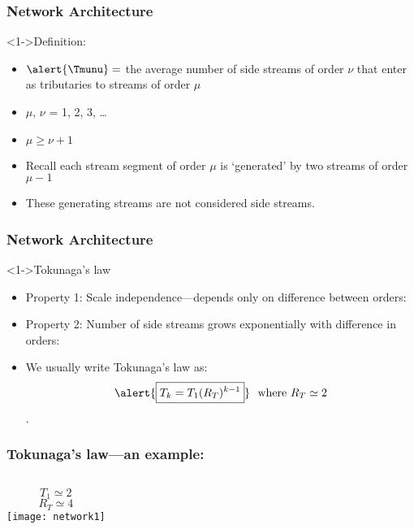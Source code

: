 
\begin{frame}[label=]
  \frametitle{Network Architecture}

  \begin{block}<1->{Definition:}
    \begin{itemize}
    \item<1-> 
      $ \alert{\Tmunu} = $
      the average number of \alert{side streams} of \alert{order $\nu$}
      that enter as tributaries to 
      streams of \alert{order $\mu$}
    \item<2-> $\mu$, $\nu$ = 1, 2, 3, \ldots
    \item<3-> $\mu \ge \nu+1$
    \item<4-> Recall each stream segment of order $\mu$ is `generated' by
      two streams of order $\mu-1$
    \item<5->These generating streams are not considered side streams.
    \end{itemize}
  \end{block}

\end{frame}

\begin{frame}[label=]
  \frametitle{Network Architecture}

  \begin{block}<1->{Tokunaga's law}
    \begin{itemize}
    \item<2->
      Property 1: Scale independence---depends only on difference between orders:
    \item<4->
      Property 2: Number of side streams grows exponentially with difference in orders:
    \item<6->
      We usually write Tokunaga's law as:
      $$ \alert{\boxed{T_k = T_1 (R_T)^{k-1}}} \mbox{\ \ where $R_T \simeq 2$} $$
      .
    \end{itemize}
  \end{block}

\end{frame}

\begin{frame}[label=]
  \frametitle{Tokunaga's law---an example:}

  \begin{columns}
    $$ T_1 \simeq 2 $$
    $$ R_T \simeq 4 $$
    \texttt{[image: network1]}
  \end{columns}

\end{frame}


